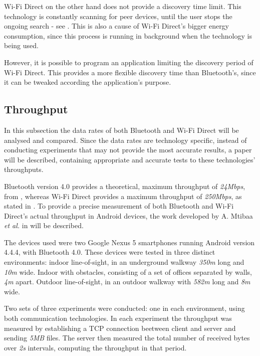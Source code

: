 Wi-Fi Direct on the other hand does not provide a discovery time limit. This technology is constantly scanning for peer devices, until the user stops the ongoing search - see \cite{wfddisc}. This is also a cause of Wi-Fi Direct's bigger energy consumption, since this process is running in background when the technology is being used.

However, it is possible to program an application limiting the discovery period of Wi-Fi Direct. This provides a more flexible discovery time than Bluetooth's, since it can be tweaked according the application's purpose.

\subsection{Throughput}
\label{subsec:normalftdr}

In this subsection the data rates of both Bluetooth and Wi-Fi Direct will be analysed and compared. Since the data rates are technology specific, instead of conducting experiments that may not provide the most accurate results, a paper will be described, containing appropriate and accurate tests to these technologies' throughputs.

Bluetooth version 4.0 provides a theoretical, maximum throughput of \textit{24Mbps}, from \cite{bluetoothspec}, whereas Wi-Fi Direct provides a maximum throughput of \textit{250Mbps}, as stated in \cite{wfdrate}. To provide a precise measurement of both Bluetooth and Wi-Fi Direct's actual throughput in Android devices, the work developed by A. Mtibaa \textit{et al.} in \cite{throughputpaper} will be described. 

The devices used were two Google Nexus 5 smartphones running Android version 4.4.4, with Bluetooth 4.0. These devices were tested in three distinct environments: indoor line-of-sight, in an underground walkway \textit{350m} long and \textit{10m} wide. Indoor with obstacles, consisting of a set of offices separated by walls, \textit{4m} apart. Outdoor line-of-sight, in an outdoor walkway with \textit{582m} long and \textit{8m} wide.

Two sets of three experiments were conducted: one in each environment, using both communication technologies. In each experiment the throughput was measured by establishing a \gls{TCP} connection beetween client and server and sending \textit{5MB} files. The server then measured the total number of received bytes over \textit{2s} intervals, computing the throughput in that period.


